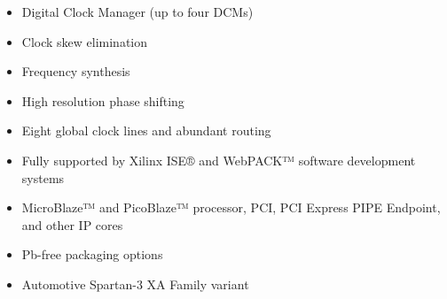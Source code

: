 \documentclass[14pt]{report}
\begin{document}
{\begin{itemize}
\item Digital Clock Manager (up to four DCMs)
\item Clock skew elimination
\item Frequency synthesis
\item High resolution phase shifting
\item Eight global clock lines and abundant routing
\item Fully supported by Xilinx ISE® and WebPACK™ software
development systems
\item MicroBlaze™ and PicoBlaze™ processor, PCI,
PCI Express PIPE Endpoint, and other IP cores
\item Pb-free packaging options
\item Automotive Spartan-3 XA Family variant
\end{itemize}
}
\end{document}
